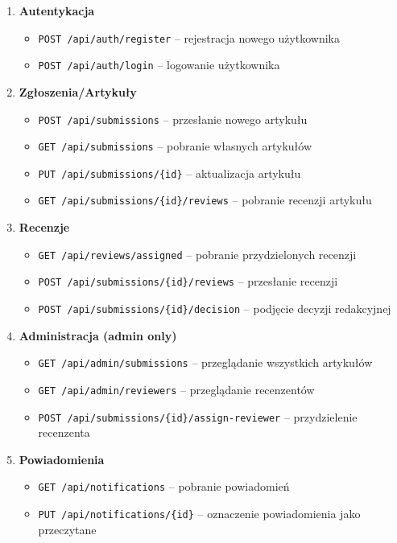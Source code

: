\documentclass[times]{san}
\begin{document}
\begin{enumerate}
    \item \textbf{Autentykacja}
    \begin{itemize}
        \item \texttt{POST /api/auth/register} -- rejestracja nowego użytkownika
        \item \texttt{POST /api/auth/login} -- logowanie użytkownika
    \end{itemize}
    
    \item \textbf{Zgłoszenia/Artykuły}
    \begin{itemize}
        \item \texttt{POST /api/submissions} -- przesłanie nowego artykułu
        \item \texttt{GET /api/submissions} -- pobranie własnych artykułów
        \item \texttt{PUT /api/submissions/\{id\}} -- aktualizacja artykułu
        \item \texttt{GET /api/submissions/\{id\}/reviews} -- pobranie recenzji artykułu
    \end{itemize}
    
    \item \textbf{Recenzje}
    \begin{itemize}
        \item \texttt{GET /api/reviews/assigned} -- pobranie przydzielonych recenzji
        \item \texttt{POST /api/submissions/\{id\}/reviews} -- przesłanie recenzji
        \item \texttt{POST /api/submissions/\{id\}/decision} -- podjęcie decyzji redakcyjnej
    \end{itemize}
    
    \item \textbf{Administracja (admin only)}
    \begin{itemize}
        \item \texttt{GET /api/admin/submissions} -- przeglądanie wszystkich artykułów
        \item \texttt{GET /api/admin/reviewers} -- przeglądanie recenzentów
        \item \texttt{POST /api/submissions/\{id\}/assign-reviewer} -- przydzielenie recenzenta
    \end{itemize}
    
    \item \textbf{Powiadomienia}
    \begin{itemize}
        \item \texttt{GET /api/notifications} -- pobranie powiadomień
        \item \texttt{PUT /api/notifications/\{id\}} -- oznaczenie powiadomienia jako przeczytane
    \end{itemize}
\end{enumerate}
\end{document}
